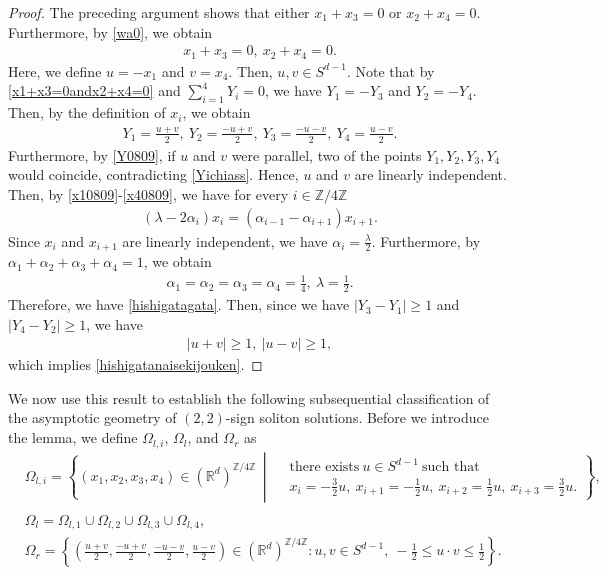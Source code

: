 \documentclass[10pt,a4paper]{amsart}
\numberwithin{equation}{section}
\begin{document}
\begin{proof}
The preceding argument shows that either $x_1+x_3=0$ or $x_2+x_4=0$. Furthermore, by \eqref{wa0}, we obtain
\begin{align}\label{x1+x3=0andx2+x4=0}
x_1+x_3=0,\ x_2+x_4=0.
\end{align}
Here, we define $u=-x_1$ and $v=x_4$. Then, $u,v\in S^{d-1}$. Note that by \eqref{x1+x3=0andx2+x4=0} and $\sum_{i=1}^4Y_i=0$, we have $Y_1=-Y_3$ and $Y_2=-Y_4$. Then, by the definition of $x_i$, we obtain
\begin{align}\label{Y0809}
Y_1=\frac{u+v}{2},\ Y_2=\frac{-u+v}{2},\ Y_3=\frac{-u-v}{2},\ Y_4=\frac{u-v}{2}.
\end{align}
Furthermore, by \eqref{Y0809}, if $u$ and $v$ were parallel, two of the points $Y_1,Y_2,Y_3,Y_4$ would coincide,
contradicting \eqref{Yichiass}. Hence, $u$ and $v$ are linearly independent. Then, by \eqref{x10809}-\eqref{x40809}, we have for every $i\in\mathbb{Z}/4\mathbb{Z}$
\begin{align*}
\left(\lambda-2\alpha_i\right)x_i=\left(\alpha_{i-1}-\alpha_{i+1}\right)x_{i+1}.
\end{align*}
Since $x_i$ and $x_{i+1}$ are linearly independent, we have $\alpha_i=\frac{\lambda}{2}$. Furthermore, by $\alpha_1+\alpha_2+\alpha_3+\alpha_4=1$, we obtain
\begin{align*}
\alpha_1=\alpha_2=\alpha_3=\alpha_4=\frac{1}{4},\ \lambda=\frac{1}{2}.
\end{align*}
Therefore, we have \eqref{hishigatagata}. Then, since we have $|Y_3-Y_1|\geq 1$ and $|Y_4-Y_2|\geq 1$, we have
\begin{align*}
|u+v|\geq 1,\ |u-v|\geq 1,
\end{align*}
which implies \eqref{hishigatanaisekijouken}.
\end{proof}


We now use this result to establish the following subsequential classification of the asymptotic geometry of $(2,2)$-sign soliton solutions. Before we introduce the lemma, we define $\Omega_{l,i}$, $\Omega_l$, and $\Omega_r$ as 
\begin{align*}
&\Omega_{l,i}
=
\left\{
(x_1,x_2,x_3,x_4)\in \left(\mathbb{R}^d\right)^{\mathbb{Z}/4\mathbb{Z}}
\,\middle|\,
\begin{aligned}
&\mbox{there exists}\ u\in S^{d-1}\ \mbox{such that} \\
&x_i=-\frac{3}{2}u,\ x_{i+1}=-\frac{1}{2}u,\ x_{i+2}=\frac{1}{2}u,\ x_{i+3}=\frac{3}{2}u.
\end{aligned}
\right\},
\\
\\
&\Omega_l=\Omega_{l,1}\cup \Omega_{l,2}\cup \Omega_{l,3}\cup \Omega_{l,4},
\\
&\Omega_r=\left\{\left(\frac{u+v}{2},\frac{-u+v}{2},\frac{-u-v}{2},\frac{u-v}{2}\right)\in \left(\mathbb{R}^d\right)^{\mathbb{Z}/4\mathbb{Z}}: u,v\in S^{d-1},\ -\frac{1}{2}\leq u\cdot v\leq \frac{1}{2}\right\}.
\end{align*}
\end{document}
